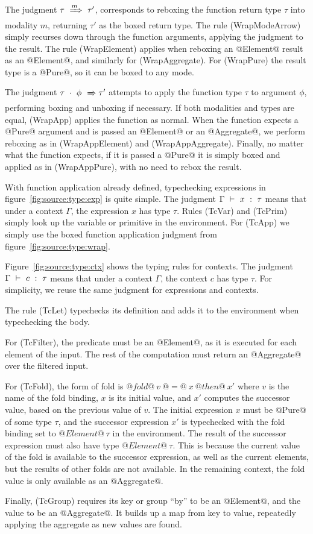 The judgment $\tau ~\xRightarrow{m}~ \tau'$, corresponds to reboxing the function return type $\tau$ into modality $m$, returning $\tau'$ as the boxed return type.
The rule (WrapModeArrow) simply recurses down through the function arguments, applying the judgment to the result.
The rule (WrapElement) applies when reboxing an @Element@ result as an @Element@, and similarly for (WrapAggregate).
For (WrapPure) the result type is a @Pure@, so it can be boxed to any mode.

The judgment $\tau~\cdot~\phi ~\xRightarrow~ \tau'$ attempts to apply the function type $\tau$ to argument $\phi$, performing boxing and unboxing if necessary.
If both modalities and types are equal, (WrapApp) applies the function as normal.
When the function expects a @Pure@ argument and is passed an @Element@ or an @Aggregate@, we perform reboxing as in (WrapAppElement) and (WrapAppAggregate).
Finally, no matter what the function expects, if it is passed a @Pure@ it is simply boxed and applied as in (WrapAppPure), with no need to rebox the result.




With function application already defined, typechecking expressions in figure~\ref{fig:source:type:exp} is quite simple.
The judgment $\Gamma ~\vdash~ x ~:~ \tau$ means that under a context $\Gamma$, the expression $x$ has type $\tau$.
Rules (TcVar) and (TcPrim) simply look up the variable or primitive in the environment.
For (TcApp) we simply use the boxed function application judgment from figure~\ref{fig:source:type:wrap}.



Figure~\ref{fig:source:type:ctx} shows the typing rules for contexts.
The judgment $\Gamma ~\vdash~ c ~:~ \tau$ means that under a context $\Gamma$, the context $c$ has type $\tau$.
For simplicity, we reuse the same judgment for expressions and contexts.

The rule (TcLet) typechecks its definition and adds it to the environment when typechecking the body.

For (TcFilter), the predicate must be an @Element@, as it is executed for each element of the input.
The rest of the computation must return an @Aggregate@ over the filtered input.

For (TcFold), the form of fold is $@fold@~v~@=@~x~@then@~x'$ where $v$ is the name of the fold binding, $x$ is its initial value, and $x'$ computes the successor value, based on the previous value of $v$.
The initial expression $x$ must be @Pure@ of some type $\tau$, and the successor expression $x'$ is typechecked with the fold binding set to $@Element@~\tau$ in the environment.
The result of the successor expression must also have type $@Element@~\tau$.
This is because the current value of the fold is available to the successor expression, as well as the current elements, but the results of other folds are not available.
In the remaining context, the fold value is only available as an @Aggregate@.

Finally, (TcGroup) requires its key or group ``by'' to be an @Element@, and the value to be an @Aggregate@.
It builds up a map from key to value, repeatedly applying the aggregate as new values are found.





